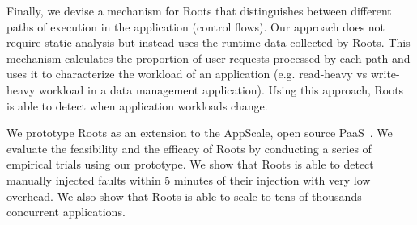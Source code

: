 Finally, we devise a mechanism for Roots that distinguishes
between different paths of execution in the application (control flows).
Our approach does not require static analysis but instead uses the 
runtime data collected by Roots. This mechanism calculates the 
proportion of user requests processed by each path and uses it to 
characterize the workload
of an application (e.g. read-heavy vs write-heavy workload 
in a data management
application). Using this approach, Roots is able to
detect when application workloads change.

We prototype
Roots as an extension to the AppScale, open source PaaS~\cite{6488671}. 
We evaluate the feasibility and the 
efficacy of Roots by conducting a series of empirical trials 
using our prototype. We show that Roots is able to detect manually injected
faults within 5 minutes of their injection with very low overhead.
We also show that Roots is able to scale to tens of thousands 
concurrent applications.
